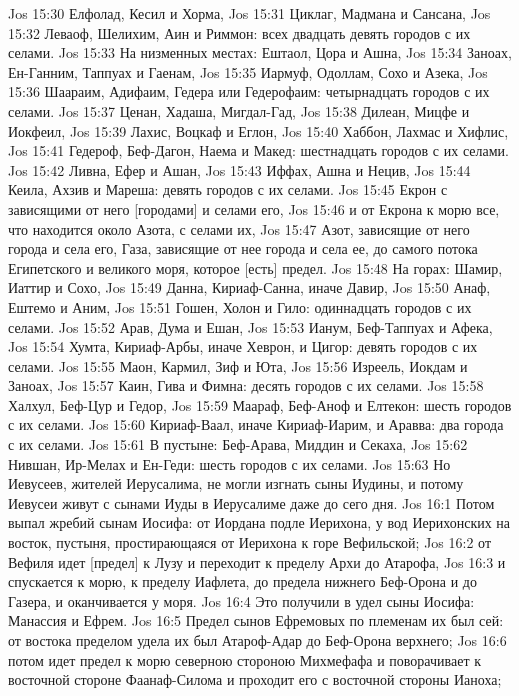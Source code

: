 Jos 15:30  Елфолад, Кесил и Хорма,
Jos 15:31  Циклаг, Мадмана и Сансана,
Jos 15:32  Леваоф, Шелихим, Аин и Риммон: всех двадцать девять городов с их селами.
Jos 15:33  На низменных местах: Ештаол, Цора и Ашна,
Jos 15:34  Заноах, Ен-Ганним, Таппуах и Гаенам,
Jos 15:35  Иармуф, Одоллам, Сохо и Азека,
Jos 15:36  Шаараим, Адифаим, Гедера или Гедерофаим: четырнадцать городов с их селами.
Jos 15:37  Ценан, Хадаша, Мигдал-Гад,
Jos 15:38  Дилеан, Мицфе и Иокфеил,
Jos 15:39  Лахис, Воцкаф и Еглон,
Jos 15:40  Хаббон, Лахмас и Хифлис,
Jos 15:41  Гедероф, Беф-Дагон, Наема и Макед: шестнадцать городов с их селами.
Jos 15:42  Ливна, Ефер и Ашан,
Jos 15:43  Иффах, Ашна и Нецив,
Jos 15:44  Кеила, Ахзив и Мареша: девять городов с их селами.
Jos 15:45  Екрон с зависящими от него [городами] и селами его,
Jos 15:46  и от Екрона к морю все, что находится около Азота, с селами их,
Jos 15:47  Азот, зависящие от него города и села его, Газа, зависящие от нее города и села ее, до самого потока Египетского и великого моря, которое [есть] предел.
Jos 15:48  На горах: Шамир, Иаттир и Сохо,
Jos 15:49  Данна, Кириаф-Санна, иначе Давир,
Jos 15:50  Анаф, Ештемо и Аним,
Jos 15:51  Гошен, Холон и Гило: одиннадцать городов с их селами.
Jos 15:52  Арав, Дума и Ешан,
Jos 15:53  Ианум, Беф-Таппуах и Афека,
Jos 15:54  Хумта, Кириаф-Арбы, иначе Хеврон, и Цигор: девять городов с их селами.
Jos 15:55  Маон, Кармил, Зиф и Юта,
Jos 15:56  Изреель, Иокдам и Заноах,
Jos 15:57  Каин, Гива и Фимна: десять городов с их селами.
Jos 15:58  Халхул, Беф-Цур и Гедор,
Jos 15:59  Маараф, Беф-Аноф и Елтекон: шесть городов с их селами.
Jos 15:60  Кириаф-Ваал, иначе Кириаф-Иарим, и Аравва: два города с их селами.
Jos 15:61  В пустыне: Беф-Арава, Миддин и Секаха,
Jos 15:62  Нившан, Ир-Мелах и Ен-Геди: шесть городов с их селами.
Jos 15:63  Но Иевусеев, жителей Иерусалима, не могли изгнать сыны Иудины, и потому Иевусеи живут с сынами Иуды в Иерусалиме даже до сего дня.
Jos 16:1  Потом выпал жребий сынам Иосифа: от Иордана подле Иерихона, у вод Иерихонских на восток, пустыня, простирающаяся от Иерихона к горе Вефильской;
Jos 16:2  от Вефиля идет [предел] к Лузу и переходит к пределу Архи до Атарофа,
Jos 16:3  и спускается к морю, к пределу Иафлета, до предела нижнего Беф-Орона и до Газера, и оканчивается у моря.
Jos 16:4  Это получили в удел сыны Иосифа: Манассия и Ефрем.
Jos 16:5  Предел сынов Ефремовых по племенам их был сей: от востока пределом удела их был Атароф-Адар до Беф-Орона верхнего;
Jos 16:6  потом идет предел к морю северною стороною Михмефафа и поворачивает к восточной стороне Фаанаф-Силома и проходит его с восточной стороны Ианоха;

